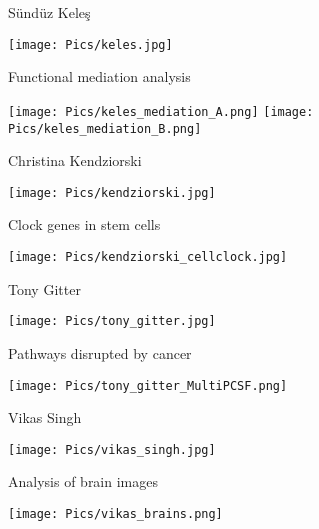 \documentclass[12pt,t,aspectratio=169]{beamer}
\begin{document}
\begin{frame}{S\"und\"uz Kele\c{s}}

\hspace*{0.85\textwidth}
\texttt{[image: Pics/keles.jpg]}
\vspace*{-30mm}

{\large Functional mediation analysis}

\bigskip

\texttt{[image: Pics/keles\_mediation\_A.png]}
\texttt{[image: Pics/keles\_mediation\_B.png]}


\end{frame}


\begin{frame}{Christina Kendziorski}

\hspace*{0.85\textwidth}
\texttt{[image: Pics/kendziorski.jpg]}
\vspace*{-30mm}

{\large Clock genes in stem cells}

\bigskip

\texttt{[image: Pics/kendziorski\_cellclock.jpg]}


\end{frame}



\begin{frame}{Tony Gitter}

\hspace*{0.85\textwidth}
\texttt{[image: Pics/tony\_gitter.jpg]}
\vspace*{-30mm}

{\large Pathways disrupted by cancer}

\bigskip

\texttt{[image: Pics/tony\_gitter\_MultiPCSF.png]}


\end{frame}


\begin{frame}{Vikas Singh}

\hspace*{0.85\textwidth}
\texttt{[image: Pics/vikas\_singh.jpg]}
\vspace*{-30mm}

{\large Analysis of brain images}

\bigskip

\texttt{[image: Pics/vikas\_brains.png]}


\end{frame}
\end{document}
